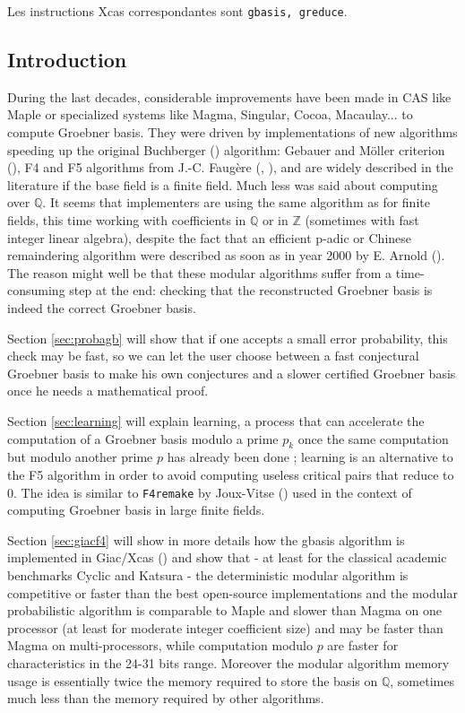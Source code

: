 \documentclass[a4paper,11pt]{article}
\newcommand{\Z}{{\mathbb{Z}}}
\newcommand{\Q}{{\mathbb{Q}}}
\begin{document}
Les instructions Xcas correspondantes sont {\tt gbasis, greduce}.



\subsection{Introduction}
During the last decades, considerable improvements have been made 
in CAS like Maple or specialized systems like Magma, Singular, 
Cocoa, Macaulay... to compute Groebner basis. 
They were driven by
implementations of new algorithms speeding up the original Buchberger 
(\cite{buchberger1985grobner})
algorithm: Gebauer and M\"oller criterion (\cite{Gebauer1988275}), F4 and F5
algorithms from J.-C. Faug\`ere (\cite{F99a}, \cite{Fau02a}), and are widely described in the
literature if the base field is a finite field.
Much less was said about computing over $\Q$. It seems that
implementers are using the same algorithm as for finite fields,
this time working with coefficients in $\Q$ or in $\Z$ (sometimes
with fast integer linear algebra), 
despite the fact that an efficient p-adic or Chinese remaindering
algorithm were described as soon as in year 2000 by E. Arnold
(\cite{Arnold2003403}). 
The reason might well be that these modular algorithms suffer from a
time-consuming step at the end: checking that the reconstructed
Groebner basis is indeed the correct Groebner basis.

Section \ref{sec:probagb}
will show that if one accepts a small error probability, this check 
may be fast, so we can let the user choose between a fast conjectural
Groebner basis to make his own conjectures and a slower certified
Groebner basis once he needs a mathematical proof.

Section \ref{sec:learning}
 will explain learning, a process that can accelerate the
computation of a Groebner basis modulo a prime $p_k$ once the
same computation but modulo another prime $p$ has already been
done ; learning is an alternative to the F5 algorithm
in order to avoid computing useless critical pairs that reduce to 0. The
idea is similar to {\tt F4remake} by Joux-Vitse (\cite{joux2011variant}) 
used in the context of computing Groebner basis in large finite fields.

Section \ref{sec:giacf4} 
will show in more details how the gbasis algorithm is implemented
in Giac/Xcas (\cite{giac}) and show that - at least for the classical academic
benchmarks Cyclic and Katsura - the deterministic modular algorithm
is competitive or faster than the best open-source implementations
and the modular probabilistic algorithm is comparable to Maple
and slower than Magma on one processor (at least for moderate integer coefficient
size) and may be faster than Magma on multi-processors, 
while computation modulo $p$ are faster for characteristics in the
24-31 bits range.
Moreover the modular algorithm memory usage is essentially
twice the memory required to store the basis on $\Q$, sometimes
much less than the memory required by other algorithms.
\end{document}
